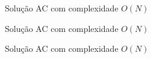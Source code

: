 \begin{frame}[fragile]{Solução AC com complexidade $O(N)$}
\end{frame}

\begin{frame}[fragile]{Solução AC com complexidade $O(N)$}
\end{frame}

\begin{frame}[fragile]{Solução AC com complexidade $O(N)$}
\end{frame}
